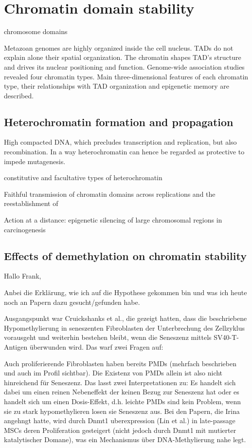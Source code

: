 \chapter{Chromatin domain stability}
\minitoc


chromosome domains \cite{Sexton2015}


Metazoan genomes are highly organized inside the cell nucleus.
TADs do not explain alone their spatial organization.
The chromatin shapes TAD's structure and drives its nuclear positioning and function.
Genome-wide association studies revealed four chromatin types.
Main three-dimensional features of each chromatin type, their relationships with TAD organization and epigenetic memory are described.

\section{Heterochromatin formation and propagation}
High compacted DNA, which precludes transcription and replication, but also recombination. In a way heterochromatin can hence be regarded as protective to impede mutagenesis. 

constitutive and facultative types of heterochromatin

Faithful transmission of chromatin domains across replications and the reestablishment of 


Action at a distance: epigenetic silencing of large chromosomal regions in carcinogenesis \cite{Clark2007}

\section{Effects of demethylation on chromatin stability}

Hallo Frank,


Anbei die Erklärung, wie ich auf die Hypothese gekommen bin und was ich heute noch an Papern dazu gesucht/gefunden habe. 


Ausgangspunkt war Cruickshanks et al., die gezeigt hatten, dass die beschriebene Hypomethylierung in seneszenten Fibroblasten der Unterbrechung des Zellzyklus vorausgeht und weiterhin bestehen bleibt, wenn die Seneszenz mittels SV40-T-Antigen überwunden wird. Das warf zwei Fragen auf:

Auch proliferierende Fibroblasten haben bereits PMDs (mehrfach beschrieben und auch im Profil sichtbar). Die Existenz von PMDs allein ist also nicht hinreichend für Seneszenz. Das lasst zwei Interpretationen zu: Es handelt sich dabei um einen reinen Nebeneffekt der keinen Bezug zur Seneszenz hat oder es handelt sich um einen Dosis-Effekt, d.h. leichte PMDs sind kein Problem, wenn sie zu stark hypomethylieren losen sie Seneszenz aus. Bei den Papern, die Irina angehngt hatte, wird durch Dnmt1 uberexpression (Lin et al.) in late-passage MSCs deren Proliferation gesteigert (nicht jedoch durch Dnmt1 mit mutierter katalytischer Domane), was ein Mechanismus über DNA-Methylierung nahe legt. 

